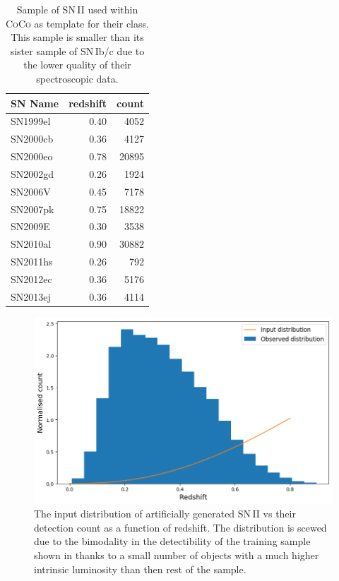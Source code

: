 \begin{table}
  \caption{Sample of SN\,II used within \textsc{CoCo} as template for their class. This sample is smaller than its sister sample of SN\,Ib/c due to the lower quality of their spectroscopic data.}
  \label{tab:SNIITemplates}
  \centering
  \begin{tabular}{l|r|r}
    SN Name  & redshift & count \\
    \hline
    SN1999el & 0.40 &  4052 \\
    SN2000cb & 0.36 &  4127 \\
    SN2000eo & 0.78 & 20895 \\
    SN2002gd & 0.26 &  1924 \\
    SN2006V  & 0.45 &  7178 \\
    SN2007pk & 0.75 & 18822 \\
    SN2009E  & 0.30 &  3538 \\
    SN2010al & 0.90 & 30882 \\
    SN2011hs & 0.26 &   792 \\
    SN2012ec & 0.36 &  5176 \\
    SN2013ej & 0.36 &  4114 \\
    \hline
  \end{tabular}
\end{table}

\begin{figure}
  \includegraphics[width=\textwidth]{Figures/Chapter5/SNII_z_dist.png}
  \caption{The input distribution of artificially generated SN\,II vs their detection count as a function of redshift. The distribution is scewed due to the bimodality in the detectibility of the training sample shown in  thanks to a small number of objects with a much higher intrinsic luminosity than then rest of the sample.}
  \label{fig:IIDist}
\end{figure}

